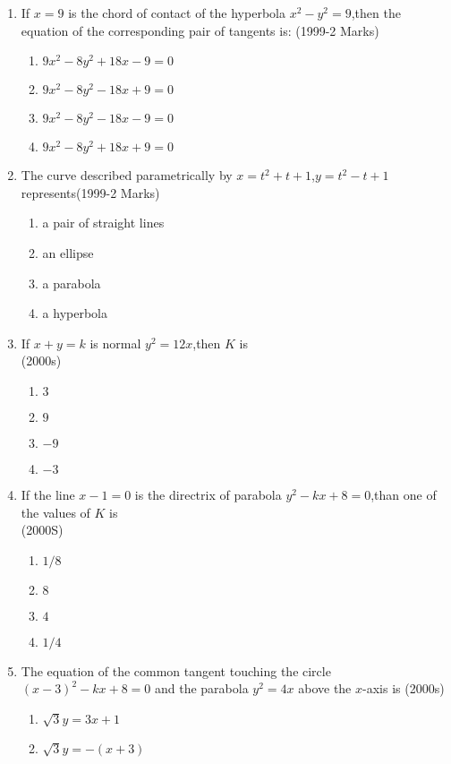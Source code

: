 \documentclass[journal,12pt,twocolumn]{IEEEtran}
\theoremstyle{remark}
\begin{document}
\begin{enumerate}
\item If $x=9$ is the chord of contact of the hyperbola $x^2-y^2=9$,then the equation of the corresponding pair of tangents is:
\hfill (1999-2 Marks)
\begin{enumerate}
    \item $9x^2-8y^2+18x-9=0$
    \item $9x^2-8y^2-18x+9=0$
    \item $9x^2-8y^2-18x-9=0$
    \item $9x^2-8y^2+18x+9=0$\\
\end{enumerate}
\item The curve described parametrically by $x=t^2+t+1$,$y=t^2-t+1$ represents\hfill(1999-2 Marks)
\begin{enumerate}
    \item a pair of straight lines
    \item an ellipse
    \item a parabola
    \item a hyperbola\\
\end{enumerate}
\item If $x+y=k$ is normal $y^2=12x$,then $K$ is\\\hfill(2000s)
\begin{enumerate}
    \item $3$
    \item $9$
    \item $-9$
    \item $-3$\\
\end{enumerate}
\item If the line $x-1=0$ is the directrix of parabola $y^2-kx+8=0$,than one of the values of $K$ is\\\hfill(2000S)
\begin{enumerate}
    \item $1/8$
    \item $8$
    \item $4$
    \item $1/4$\\
\end{enumerate}
\item The equation of the common tangent touching the circle $(x-3)^2-kx+8=0$ and the parabola $y^2=4x$ above the $x$-axis is \hfill(2000s)
\begin{enumerate}
    \item $\sqrt{3}y=3x+1$
    \item $\sqrt{3}y=-(x+3)$

\end{enumerate}
\end{enumerate}
\end{document}
